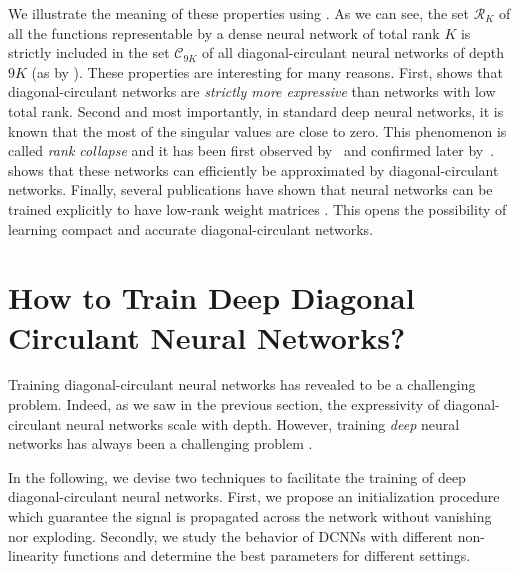 \noindent
We illustrate the meaning of these properties using .
As we can see, the set $\mathcal{R}_K$ of all the functions representable by a dense neural network of total rank $K$ is strictly included in the set $\mathcal C_{9K}$ of all diagonal-circulant neural networks of depth $9K$ (as by ).
These properties are interesting for many reasons. 
First,  shows that diagonal-circulant networks are \emph{strictly more expressive} than networks with low total rank. 
Second and most importantly, in standard deep neural networks, it is known that the most of the singular values are close to zero. This phenomenon is called \emph{rank collapse} and it has been first observed by~\citet{saxe2013exact} and confirmed later by~\citet{sedghi2018singular,arora2019implicit}.
 shows that these networks can efficiently be approximated by diagonal-circulant networks.
Finally, several publications have shown that neural networks can be trained explicitly to have low-rank weight matrices \cite{chong18eccv, goyal2019compression}.
This opens the possibility of learning compact and accurate diagonal-circulant networks.


\section{How to Train Deep Diagonal Circulant Neural Networks?}
\label{section:ch4-how_to_train_deep_diagonal_circulant_neural_networks}

Training diagonal-circulant neural networks has revealed to be a challenging problem.
Indeed, as we saw in the previous section, the expressivity of diagonal-circulant neural networks scale with depth.
However, training \emph{deep} neural networks has always been a challenging problem \cite{he2016deep}.

In the following, we devise two techniques to facilitate the training of deep diagonal-circulant neural networks.
First, we propose an initialization procedure which guarantee the signal is propagated across the network without vanishing nor exploding.
Secondly, we study the behavior of DCNNs with different non-linearity functions and determine the best parameters for different settings. 

